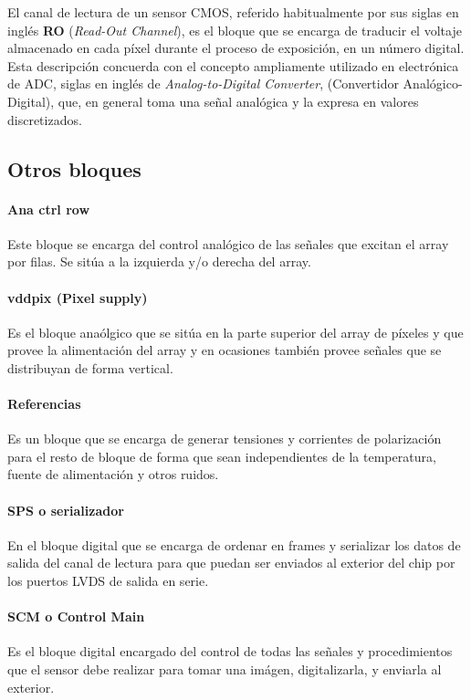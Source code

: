 El canal de lectura de un sensor CMOS, referido habitualmente por sus
siglas en inglés \textbf{RO} (\textit{Read-Out Channel}), es el bloque que se
encarga de traducir el voltaje almacenado en cada píxel durante el proceso
de exposición, en un número digital. Esta descripción concuerda con el concepto
ampliamente utilizado en electrónica de ADC, siglas en inglés de \textit{Analog-to-Digital
Converter}, (Convertidor Analógico-Digital), que, en general toma una señal
analógica y la expresa en valores discretizados.\\

\subsection{Otros bloques}

\paragraph{Ana ctrl row} Este bloque se encarga del control analógico de las
señales que excitan el array por filas. Se sitúa a la izquierda y/o derecha del
array.

\paragraph{vddpix (Pixel supply)} Es el bloque anaólgico que se sitúa en la parte superior
del array de píxeles y que provee la alimentación del array
y en ocasiones también provee señales que se distribuyan de forma vertical.

\paragraph{Referencias} Es un bloque que se encarga de generar tensiones y corrientes
de polarización para el resto de bloque de forma que sean independientes de la
temperatura, fuente de alimentación y otros ruidos.

\paragraph{SPS o serializador} En el bloque digital que se encarga de ordenar en frames y serializar
los datos de salida del canal de lectura para que puedan ser enviados al exterior del
chip por los puertos LVDS de salida en serie.

\paragraph{SCM o Control Main} Es el bloque digital encargado del control de todas las
señales y procedimientos que el sensor debe realizar para tomar una imágen, digitalizarla,
y enviarla al exterior.

